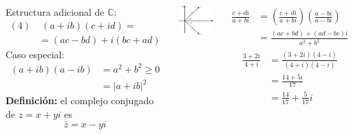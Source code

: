 \documentclass[9pt, aspectratio=169]{beamer}
\begin{document}
\begin{frame}
 \begin{columns}[t]
  Estructura adicional de $\mathbb{C}$:
  \begin{align*}
   (4)&\; (a + ib)(c + id) = \\
   &= (ac - bd) + i (bc + ad)
  \end{align*}
  Caso especial:
  \begin{align*}
   (a + ib)(a - ib) &= a^2 + b^2 \geq 0 \\
   &= |a + i b|^2
  \end{align*}
  \textbf{Definición:} el complejo conjugado de $z = x + y i$ es
  \[ \bar{z} = x - y i \]
    \begin{center}
    \includegraphics[scale=0.25]{figs/conjugado.pdf}
    \end{center}
  
  \begin{align*}
   \frac{c + di}{a + bi} &= \left(\frac{c + di}{a + bi}\right) \left(\frac{a - bi}{a - bi}\right) \\
   &= \frac{(ac + bd) + (ad - bc)i}{a^2 + b^2}
  \end{align*}
  \begin{align*}
   \frac{3 + 2 i}{4 + i} &= \frac{(3 + 2i)(4 - i)}{(4 + i)(4 - i)} \\
   &= \frac{14 + 5 i}{17} \\
   &= \frac{14}{17} + \frac{5}{17}i
  \end{align*}
  

\end{columns}
\end{frame}
\end{document}
